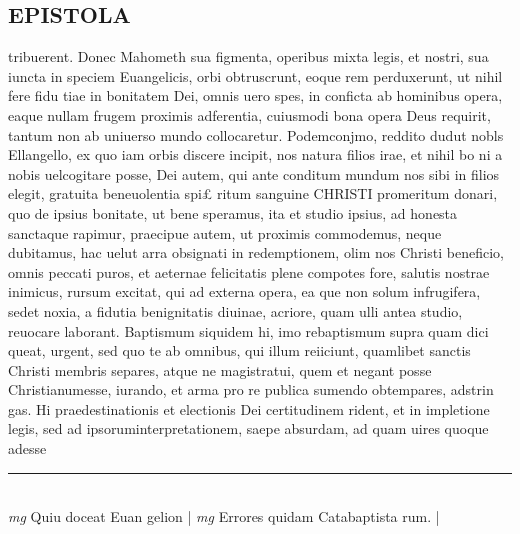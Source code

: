 \documentclass{article}
\begin{document}
\begin{pages}
\section*{EPISTOLA}\pstart tribuerent. Donec Mahometh sua figmenta, operibus mixta legis, et nostri, sua iuncta in speciem Euangelicis, orbi obtruscrunt, eoque rem perduxerunt, ut nihil fere fidu tiae in bonitatem Dei, omnis uero spes, in conficta ab hominibus opera, eaque nullam frugem proximis adferentia, cuiusmodi bona opera Deus requirit, tantum non ab uniuerso mundo collocaretur.  \pend\pstart  Podemconjmo, reddito dudut nobls Ellangello, ex quo iam orbis discere incipit, nos natura filios irae, et nihil bo ni a nobis uelcogitare posse, Dei autem, qui ante conditum mundum nos sibi in filios elegit, gratuita beneuolentia spi£ ritum sanguine CHRISTI promeritum donari, quo de ipsius bonitate, ut bene speramus, ita et studio ipsius, ad honesta sanctaque rapimur, praecipue autem, ut proximis commodemus, neque dubitamus, hac uelut arra obsignati in redemptionem, olim nos Christi beneficio, omnis peccati puros, et aeternae felicitatis plene compotes fore, salutis nostrae inimicus, rursum excitat, qui ad externa opera, ea que non solum infrugifera, sedet noxia, a fidutia benignitatis diuinae, acriore, quam ulli antea studio, reuocare laborant. Baptismum siquidem hi, imo rebaptismum supra quam dici queat, urgent, sed quo te ab omnibus, qui illum reiiciunt, quamlibet sanctis Christi membris separes, atque ne magistratui, quem et negant posse Christianumesse, iurando, et arma pro re publica sumendo obtempares, adstrin gas. Hi praedestinationis et electionis Dei certitudinem rident, et in impletione legis, sed ad ipsoruminterpretationem, saepe absurdam, ad quam uires quoque adesse  \pend
\vspace{0.5cm}\noindent
\vspace{0.2cm}\rule{1cm}{0.2pt}\\ 
\hspace{0.2cm}\textit{mg}
\footnotesize Quiu doceat Euan gelion
\normalsize| 
\hspace{0.2cm}\textit{mg}
\footnotesize Errores quidam Catabaptista rum. 
\normalsize| 

\end{pages}
\end{document}
